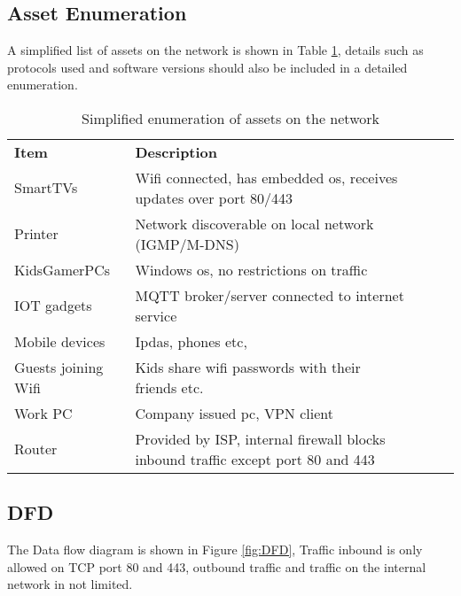 \documentclass[
	letterpaper, %
	10pt, %
	unnumberedsections, %
	twoside, %
]{APAAssignment}
\begin{document}
\subsection{Asset Enumeration}
A simplified list of assets on the network is shown in Table \ref{tab:assets}, details such as protocols used and software versions should also be included in a detailed enumeration.

\begin{table}[htp]
	\begin{tabular}{|l|l|lll}
		\cline{1-2}
		\textbf{Item}       & \textbf{Description}                                                             &  &  &  \\ \cline{1-2}
		SmartTVs           & Wifi connected, has embedded os, receives updates over port 80/443               &  &  &  \\ \cline{1-2}
		Printer             & Network discoverable on local network (IGMP/M-DNS)                               &  &  &  \\ \cline{1-2}
		KidsGamerPCs       & Windows os, no restrictions on traffic                                           &  &  &  \\ \cline{1-2}
		IOT gadgets         & MQTT broker/server connected to internet service                                 &  &  &  \\ \cline{1-2}
		Mobile devices      & Ipdas, phones etc,                                                               &  &  &  \\ \cline{1-2}
		Guests joining Wifi & Kids share wifi passwords with their friends etc.                                &  &  &  \\ \cline{1-2}
		Work PC             & Company issued pc, VPN client                                                    &  &  &  \\ \cline{1-2}
		Router              & Provided by ISP, internal firewall blocks inbound traffic except port 80 and 443 &  &  &  \\ \cline{1-2}
	\end{tabular}
	\caption{Simplified enumeration of assets on the network}
	\label{tab:assets}
\end{table}


\subsection{DFD}
The Data flow diagram is shown in Figure \ref{fig:DFD}, Traffic inbound is only allowed on TCP port 80 and 443, outbound traffic and traffic on the internal network in not limited. 
\end{document}
